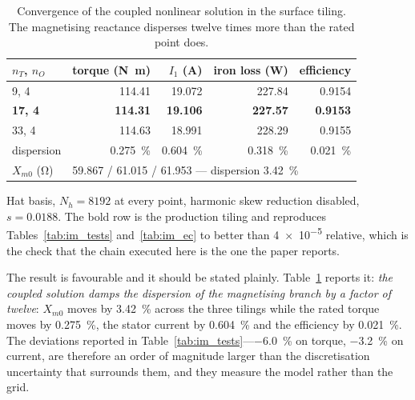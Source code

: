 \documentclass[10pt,a4paper,twocolumn]{article}
\theoremstyle{plain}
\theoremstyle{remark}
\begin{document}
\begin{table}[!ht]
\centering
\begin{threeparttable}
\footnotesize
\begin{tabular}{@{}lrrrr@{}}
\toprule
$n_T$, $n_O$ & torque (\si{\newton\metre}) & $I_1$ (\si{\ampere}) & iron loss (\si{\watt}) & efficiency\\
\midrule
9, 4 & \num{114.41} & \num{19.072} & \num{227.84} & \num{0.9154}\\
\textbf{17, 4} & \textbf{\num{114.31}} & \textbf{\num{19.106}} & \textbf{\num{227.57}} & \textbf{\num{0.9153}}\\
33, 4 & \num{114.63} & \num{18.991} & \num{228.29} & \num{0.9155}\\
\midrule
dispersion & \SI{0.275}{\percent} & \SI{0.604}{\percent} & \SI{0.318}{\percent} & \SI{0.021}{\percent}\\
\midrule
$X_{m0}$ (\si{\ohm}) & \multicolumn{4}{l}{\num{59.867} / \num{61.015} / \num{61.953} --- dispersion \SI{3.42}{\percent}}\\
\bottomrule
\end{tabular}
\begin{tablenotes}[flushleft]\footnotesize
\item Hat basis, $N_h=\num{8192}$ at every point, harmonic skew
reduction disabled, $s=\num{0.0188}$. The bold row is the production
tiling and reproduces Tables~\ref{tab:im_tests} and~\ref{tab:im_ec} to
better than \num{4e-5} relative, which is the check that the chain
executed here is the one the paper reports.
\end{tablenotes}
\end{threeparttable}
\caption{Convergence of the coupled nonlinear solution in the surface
tiling. The magnetising reactance disperses twelve times more than the
rated point does.}
\label{tab:coupled}
\end{table}

The result is favourable and it should be stated plainly.
Table~\ref{tab:coupled} reports it: \emph{the coupled solution damps the
dispersion of the magnetising branch by a factor of twelve}: $X_{m0}$ moves by \SI{3.42}{\percent}
across the three tilings while the rated torque moves by
\SI{0.275}{\percent}, the stator current by \SI{0.604}{\percent} and the
efficiency by \SI{0.021}{\percent}. The deviations reported in
Table~\ref{tab:im_tests}---\SI{-6.0}{\percent} on torque,
\SI{-3.2}{\percent} on current, are therefore an order of magnitude
larger than the discretisation uncertainty that surrounds them, and they
measure the model rather than the grid.
\end{document}
